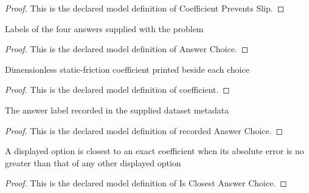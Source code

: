\begin{proof}
  This is the declared model definition of Coefficient Prevents Slip.
\end{proof}
\begin{definition}
  \label{def:physics:phyx-mini-0709:phyxminiproblems-problemphyxmini0709-answerchoice}
  Labels of the four answers supplied with the problem
\end{definition}
\begin{proof}
  This is the declared model definition of Answer Choice.
\end{proof}
\begin{definition}[coefficient]
  \label{def:physics:phyx-mini-0709:phyxminiproblems-problemphyxmini0709-answerchoice-coefficient}
  Dimensionless static-friction coefficient printed beside each choice
\end{definition}
\begin{proof}
  This is the declared model definition of coefficient.
\end{proof}
\begin{definition}
  \label{def:physics:phyx-mini-0709:phyxminiproblems-problemphyxmini0709-recordedanswerchoice}
  The answer label recorded in the supplied dataset metadata
\end{definition}
\begin{proof}
  This is the declared model definition of recorded Answer Choice.
\end{proof}
\begin{definition}
  \label{def:physics:phyx-mini-0709:phyxminiproblems-problemphyxmini0709-isclosestanswerchoice}
  A displayed option is closest to an exact coefficient when its absolute error is no greater than that of any other displayed option
\end{definition}
\begin{proof}
  This is the declared model definition of Is Closest Answer Choice.
\end{proof}
